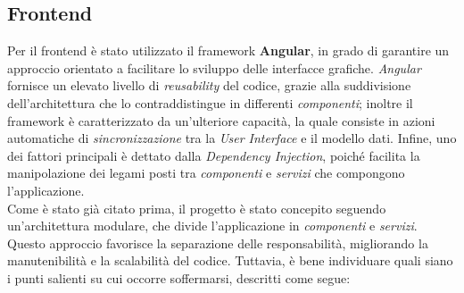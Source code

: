 \documentclass{article}
\begin{document}
\subsection{Frontend}
Per il frontend è stato utilizzato il framework \textbf{Angular}, in grado di garantire un approccio orientato a facilitare lo sviluppo delle interfacce grafiche. \textit{Angular} fornisce un elevato livello di \textit{reusability} del codice, grazie alla suddivisione dell'architettura che lo contraddistingue in differenti \textit{componenti}; inoltre il framework è caratterizzato da un'ulteriore capacità, la quale consiste in azioni automatiche di \textit{sincronizzazione} tra la \textit{User Interface} e il modello dati. Infine, uno dei fattori principali è dettato dalla \textit{Dependency Injection}, poiché facilita la manipolazione dei legami posti tra \textit{componenti} e \textit{servizi} che compongono l'applicazione.\vspace*{7pt}\\
Come è stato già citato prima, il progetto è stato concepito seguendo un'architettura modulare, che divide l'applicazione in \textit{componenti} e \textit{servizi}. Questo approccio favorisce la separazione delle responsabilità, migliorando la manutenibilità e la scalabilità del codice. Tuttavia, è bene individuare quali siano i punti salienti su cui occorre soffermarsi, descritti come segue:
\end{document}
